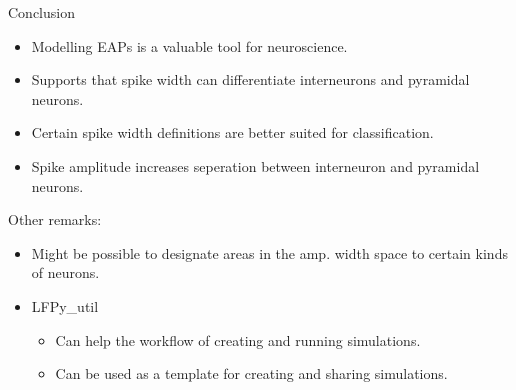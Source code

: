 \documentclass[aspectratio=169]{beamer}
\begin{document}
\begin{frame}{Conclusion}
    \begin{itemize}
        \item Modelling EAPs is a valuable tool for neuroscience. 
        \item Supports that spike width can differentiate interneurons and pyramidal neurons.
        \item Certain spike width definitions are better suited for classification.
        \item Spike amplitude increases seperation between interneuron and pyramidal neurons.
    \end{itemize}

    Other remarks: 
    \begin{itemize}
        \item Might be possible to designate areas in the amp. width space to certain kinds
            of neurons. 
        \item LFPy\_util
        \begin{itemize}
            \item Can help the workflow of creating and running simulations.
            \item Can be used as a template for creating and sharing simulations. 
        \end{itemize}
    \end{itemize}
\end{frame}
\end{document}
